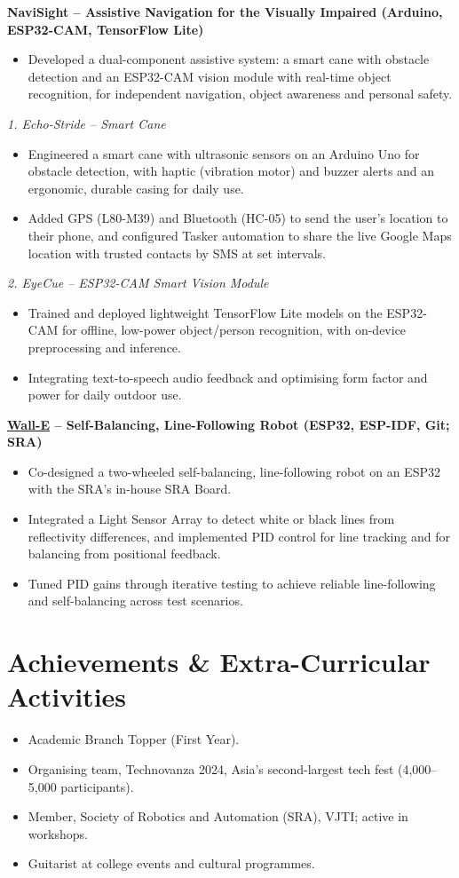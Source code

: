 \documentclass[10pt,letterpaper]{article}
\newcommand{\lnk}[2]{\href{#1}{\textcolor{linkblue}{#2}}}
\newcommand{\proj}[1]{\par\vspace{5pt}\textbf{#1}\par}
\newcommand{\sub}[1]{\par\vspace{2pt}\textit{#1}\par}
\begin{document}
\proj{NaviSight -- Assistive Navigation for the Visually Impaired \normalfont(Arduino, ESP32-CAM, TensorFlow Lite)}
\begin{itemize}
\item Developed a dual-component assistive system: a smart cane with obstacle detection and an ESP32-CAM vision module with real-time object recognition, for independent navigation, object awareness and personal safety.
\end{itemize}
\sub{1. Echo-Stride -- Smart Cane}
\begin{itemize}
\item Engineered a smart cane with ultrasonic sensors on an Arduino Uno for obstacle detection, with haptic (vibration motor) and buzzer alerts and an ergonomic, durable casing for daily use.
\item Added GPS (L80-M39) and Bluetooth (HC-05) to send the user's location to their phone, and configured Tasker automation to share the live Google Maps location with trusted contacts by SMS at set intervals.
\end{itemize}
\sub{2. EyeCue -- ESP32-CAM Smart Vision Module}
\begin{itemize}
\item Trained and deployed lightweight TensorFlow Lite models on the ESP32-CAM for offline, low-power object/person recognition, with on-device preprocessing and inference.
\item Integrating text-to-speech audio feedback and optimising form factor and power for daily outdoor use.
\end{itemize}

\proj{\lnk{https://github.com/SRA-VJTI/Wall-E}{Wall-E} -- Self-Balancing, Line-Following Robot \normalfont(ESP32, ESP-IDF, Git; SRA)}
\begin{itemize}
\item Co-designed a two-wheeled self-balancing, line-following robot on an ESP32 with the SRA's in-house SRA Board.
\item Integrated a Light Sensor Array to detect white or black lines from reflectivity differences, and implemented PID control for line tracking and for balancing from positional feedback.
\item Tuned PID gains through iterative testing to achieve reliable line-following and self-balancing across test scenarios.
\end{itemize}


\section{Achievements \& Extra-Curricular Activities}
\begin{itemize}
\item Academic Branch Topper (First Year).
\item Organising team, Technovanza 2024, Asia's second-largest tech fest (4,000--5,000 participants).
\item Member, Society of Robotics and Automation (SRA), VJTI; active in workshops.
\item Guitarist at college events and cultural programmes.
\end{itemize}
\end{document}
